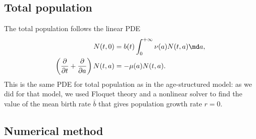 \documentclass{jpmarticle}
\begin{document}
\subsection{Total population}

The total population follows the linear PDE
\begin{equation}
  \begin{split}
    N(t, 0) &=
    b(t) \int_0^{+\infty} \nu(a) N(t, a) \md a,
    \\
    \left(\frac{\partial}{\partial t}
      + \frac{\partial}{\partial a}\right)
    N(t, a) &=
    - \mu(a) N(t, a).
  \end{split}
\end{equation}
This is the same PDE for total population as in the age-structured
model: as we did for that model, we used Floquet theory and a
nonlinear solver to find the value of the mean birth rate $\bar{b}$
that gives population growth rate $r = 0$.


\subsection{Numerical method}


\printbibliography
\end{document}
